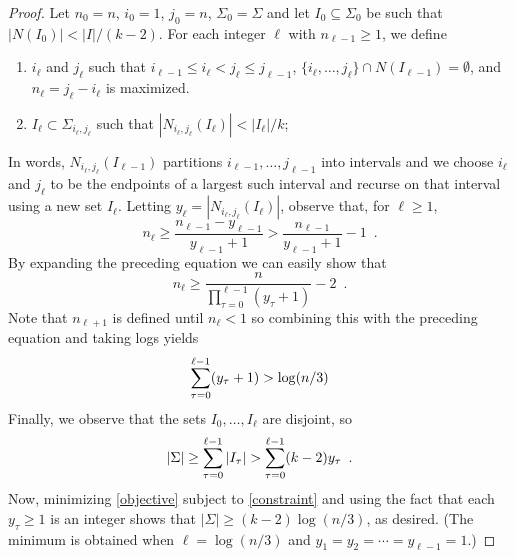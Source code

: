 \documentclass{patmorin}
\begin{document}
\begin{proof}
   Let $n_0=n$, $i_0=1$, $j_0=n$, $\Sigma_0=\Sigma$ and let
   $I_0\subseteq\Sigma_0$ be such that $|N(I_0)| < |I|/(k-2)$.
   For each integer $\ell$ with $n_{\ell-1}\ge 1$, we define 
   \begin{enumerate}
     \item $i_\ell$ and $j_\ell$ such that 
       $i_{\ell-1}\le i_\ell < j_\ell\le j_{\ell-1}$, 
       $\{i_\ell,\ldots,j_\ell\}\cap N(I_{\ell-1})=\emptyset$, 
       and $n_\ell=j_\ell-i_\ell$ is maximized.
     \item $I_\ell\subset\Sigma_{i_\ell,j_\ell}$ such that
      $|N_{i_\ell,j_\ell}(I_\ell)| < |I_\ell|/k$;
   \end{enumerate}
   In words, $N_{i_\ell,j_\ell}(I_{\ell-1})$ partitions $i_{\ell-1},\ldots,j_{\ell-1}$
   into intervals and we choose $i_\ell$ and $j_\ell$ to be the endpoints
   of a largest such interval and recurse on that interval using a new
   set $I_\ell$. Letting $y_\ell=|N_{i_\ell,j_\ell}(I_\ell)|$, observe that, for $\ell \ge 1$,
   \[
        n_\ell \ge \frac{n_{\ell-1}-y_{\ell-1}}{y_{\ell-1}+1}
               > \frac{n_{\ell-1}}{y_{\ell-1}+1} - 1 \enspace .
   \]
   By expanding the preceding equation we can easily show that
   \[
           n_{\ell} \ge \frac{n}{\prod_{\tau=0}^{\ell-1}(y_\tau+1)} - 2 \enspace .
   \]
   Note that $n_{\ell+1}$ is defined until $n_{\ell} < 1$ so combining this
   with the preceding equation and taking logs yields
   \begin{equation}
           \sum_{\tau=0}^{\ell-1}(y_\tau+1) > \log(n/3) \eqlabel{constraint}
   \end{equation}
   Finally, we observe that the sets $I_0,\ldots,I_\ell$ are disjoint, so
   \begin{equation}
          |\Sigma| \ge \sum_{\tau=0}^{\ell-1} |I_\tau| >
             \sum_{\tau=0}^{\ell-1} (k-2)y_\tau \enspace . \eqlabel{objective}
   \end{equation}
   Now, minimizing \eqref{objective} subject to \eqref{constraint} and using
   the fact that each $y_\tau \ge 1$ is an integer shows that
   $|\Sigma|\ge (k-2)\log (n/3)$, as desired.  (The minimum is obtained when
   $\ell=\log(n/3)$ and $y_1=y_2=\cdots=y_{\ell-1}=1$.)
\end{proof}
\end{document}
